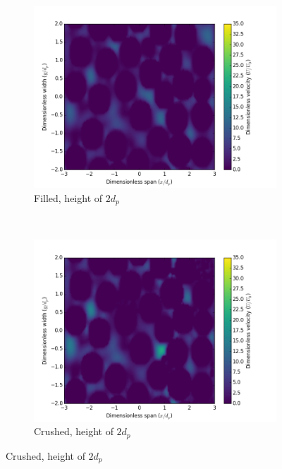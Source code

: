 \begin{figure}[!ht]
    \centering
    \begin{subfigure}[b]{0.44\textwidth}
        \includegraphics[width = \textwidth]{figures/lbm/cross-sections-filled/contour-40}
        \caption{Filled, height of $2d_p$}\label{fig:lbm-contours-filled-40}
    \end{subfigure}
    ~
    \begin{subfigure}[b]{0.44\textwidth}
        \includegraphics[width = \textwidth]{figures/lbm/cross-sections-crushed/contour-40}
        \caption{Crushed, height of $2d_p$}\label{fig:lbm-contours-crushed-40}
    \end{subfigure}


\end{figure}
